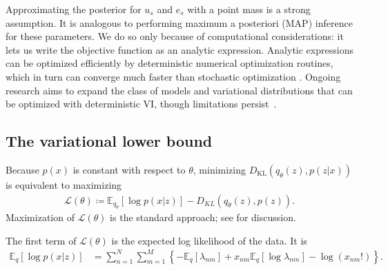 Approximating the posterior for $u_s$ and $e_s$ with a point mass is a strong assumption.
It is analogous to performing maximum a posteriori (MAP) inference for these parameters.
We do so only because of computational considerations: it lets us write the objective function as an analytic expression.
Analytic expressions can be optimized efficiently by deterministic numerical optimization routines, which
in turn can converge much faster than stochastic optimization \citep{bubeck2015convex}.
Ongoing research aims to expand the class of models and variational distributions that can be optimized with deterministic VI,
though limitations persist~\citep{fraysse2014measure,zheng2015efficient,giordano2015linear}.


\subsection{The variational lower bound}

Because $p(x)$ is constant with respect to $\theta$,
minimizing $D_{\mathrm{KL}}(q_\theta(z), p(z|x))$ is equivalent to maximizing
\begin{align}
\mathcal L(\theta) \coloneqq \mathbb{E}_{q_\theta} \left[ \log p(x | z) \right]
                   - D_{KL}(q_\theta(z), p(z)).\label{elbo}
\end{align}
Maximization of $\mathcal L(\theta)$ is the standard approach;
see \cite{blei2017variational} for discussion.

The first term of $\mathcal L(\theta)$ is the expected log likelihood of the data.
It is
\begin{align}
\mathbb{E}_{q} \left[\log p(x|z)\right]
&=\sum_{n=1}^{N} \sum_{m=1}^{M} \left\{
  -\mathbb{E}_{q}\left[\lambda_{nm}\right]
  + x_{nm}\mathbb{E}_{q}\left[\log \lambda_{nm}\right]
  -\log\left(x_{nm}!\right)
\right\}.\label{eq:log_p_last}
\end{align}

